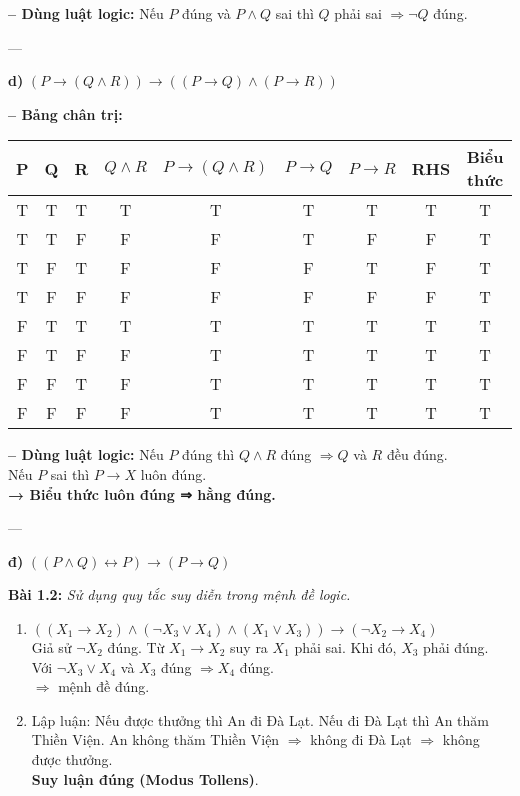 \documentclass[12pt]{article}
\begin{document}
\textbf{– Dùng luật logic:} Nếu $P$ đúng và $P \land Q$ sai thì $Q$ phải sai $\Rightarrow \neg Q$ đúng.

---

\textbf{d) } $(P \rightarrow (Q \land R)) \rightarrow ((P \rightarrow Q) \land (P \rightarrow R))$

\textbf{– Bảng chân trị:}

\begin{center}
\begin{tabular}{|c|c|c|c|c|c|c|c|c|}
\hline
P & Q & R & $Q \land R$ & $P \rightarrow (Q \land R)$ & $P \rightarrow Q$ & $P \rightarrow R$ & RHS & Biểu thức \\
\hline
T & T & T & T & T & T & T & T & T \\
T & T & F & F & F & T & F & F & T \\
T & F & T & F & F & F & T & F & T \\
T & F & F & F & F & F & F & F & T \\
F & T & T & T & T & T & T & T & T \\
F & T & F & F & T & T & T & T & T \\
F & F & T & F & T & T & T & T & T \\
F & F & F & F & T & T & T & T & T \\
\hline
\end{tabular}
\end{center}

\textbf{– Dùng luật logic:} Nếu $P$ đúng thì $Q \land R$ đúng $\Rightarrow Q$ và $R$ đều đúng.\\
Nếu $P$ sai thì $P \rightarrow X$ luôn đúng.\\
\textbf{→ Biểu thức luôn đúng ⇒ hằng đúng.}

---

\textbf{đ) } $((P \land Q) \leftrightarrow P) \rightarrow (P \rightarrow Q)$


\vspace{1em}
\noindent\textbf{Bài 1.2:} \textit{Sử dụng quy tắc suy diễn trong mệnh đề logic.}

\begin{enumerate}[label=\alph*)]
\item $((X_1 \rightarrow X_2) \land (\neg X_3 \lor X_4) \land (X_1 \lor X_3)) \rightarrow (\neg X_2 \rightarrow X_4)$\\
Giả sử $\neg X_2$ đúng. Từ $X_1 \rightarrow X_2$ suy ra $X_1$ phải sai. Khi đó, $X_3$ phải đúng. Với $\neg X_3 \lor X_4$ và $X_3$ đúng $\Rightarrow X_4$ đúng.\\
$\Rightarrow$ mệnh đề đúng.

\item Lập luận: Nếu được thưởng thì An đi Đà Lạt. Nếu đi Đà Lạt thì An thăm Thiền Viện. An không thăm Thiền Viện $\Rightarrow$ không đi Đà Lạt $\Rightarrow$ không được thưởng.\\
\textbf{Suy luận đúng (Modus Tollens)}.
\end{enumerate}
\end{document}
